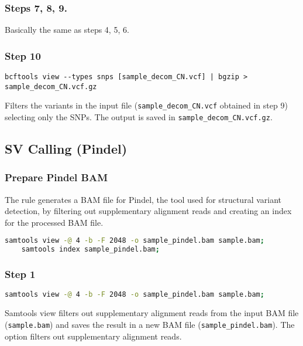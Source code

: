 \subsubsection*{Steps 7, 8, 9.} 
Basically the same as steps 4, 5, 6.

\subsubsection*{Step 10}
\begin{lstlisting}[breaklines=true]
    bcftools view --types snps [sample_decom_CN.vcf] | bgzip > sample_decom_CN.vcf.gz
\end{lstlisting}

Filters the variants in the input file (\texttt{sample\_decom\_CN.vcf} obtained in step 9) selecting only the SNPs. The output is saved in \texttt{sample\_decom\_CN.vcf.gz}.

\subsection{SV Calling (Pindel)}

\subsubsection{Prepare Pindel BAM}

The rule generates a BAM file for Pindel, the tool used for structural variant detection, by filtering out supplementary alignment reads and creating an index for the processed BAM file.

\begin{lstlisting}[breaklines=true, language=bash]
    samtools view -@ 4 -b -F 2048 -o sample_pindel.bam sample.bam;
    samtools index sample_pindel.bam;
\end{lstlisting}

\subsubsection*{Step 1}

\begin{lstlisting}[breaklines=true, language=bash]
    samtools view -@ 4 -b -F 2048 -o sample_pindel.bam sample.bam;
\end{lstlisting}

Samtools view filters out supplementary alignment reads from the input BAM file (\texttt{sample.bam}) and saves the result in a new BAM file (\texttt{sample\_pindel.bam}). The option  filters out supplementary alignment reads.

